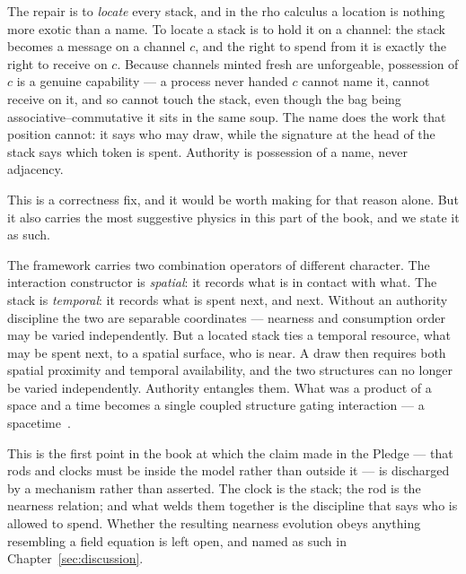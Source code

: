 The repair is to \emph{locate} every stack, and in the rho calculus a
location is nothing more exotic than a name.  To locate a stack is to hold
it on a channel: the stack becomes a message on a channel $c$, and the
right to spend from it is exactly the right to receive on $c$.  Because
channels minted fresh are unforgeable, possession of $c$ is a genuine
capability --- a process never handed $c$ cannot name it, cannot receive on
it, and so cannot touch the stack, even though the bag being
associative--commutative it sits in the same soup.  The name does the work
that position cannot: it says who may draw, while the signature at the
head of the stack says which token is spent.  Authority is possession of a
name, never adjacency.

This is a correctness fix, and it would be worth making for that reason
alone.  But it also carries the most suggestive physics in this part of
the book, and we state it as such.

\begin{remark}
\label{rmk:spacetime}
The framework carries two combination operators of different character.
The interaction constructor is \emph{spatial}: it records what is in
contact with what.  The stack is \emph{temporal}: it records what is spent
next, and next.  Without an authority discipline the two are separable
coordinates --- nearness and consumption order may be varied
independently.  But a located stack ties a temporal resource, what may be
spent next, to a spatial surface, who is near.  A draw then requires both
spatial proximity and temporal availability, and the two structures can no
longer be varied independently.  Authority entangles them.  What was a
product of a space and a time becomes a single coupled structure gating
interaction --- a spacetime~\cite[\S13]{CE}.
\end{remark}

This is the first point in the book at which the claim made in the Pledge
--- that rods and clocks must be inside the model rather than outside it
--- is discharged by a mechanism rather than asserted.  The clock is the
stack; the rod is the nearness relation; and what welds them together is
the discipline that says who is allowed to spend.  Whether the resulting
nearness evolution obeys anything resembling a field equation is left
open, and named as such in Chapter~\ref{sec:discussion}.


